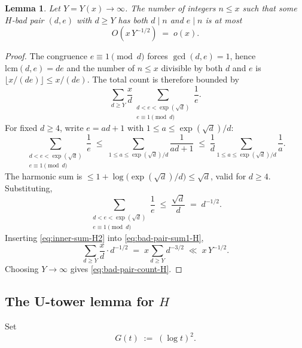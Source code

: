 \documentclass[11pt,reqno]{amsart}
\theoremstyle{plain}
\newtheorem{lemma}[theorem]{Lemma}
\theoremstyle{definition}
\begin{document}
\begin{lemma}\label{lem:bad-pair-density-H}
Let $Y=Y(x)\to\infty$. The number of integers $n\le x$ such that some
$H$-bad pair $(d,e)$ with $d\ge Y$ has both $d\mid n$ and $e\mid n$ is at most
\begin{equation}\label{eq:bad-pair-count-H}
O\!\left(x\, Y^{-1/2}\right) \;=\; o(x).
\end{equation}
\end{lemma}

\begin{proof}
The congruence $e\equiv 1\pmod d$ forces $\gcd(d,e)=1$, hence
$\mathrm{lcm}(d,e)=de$ and the number of $n\le x$ divisible by both
$d$ and $e$ is $\lfloor x/(de)\rfloor\le x/(de)$. The total count is therefore
bounded by
\begin{equation}\label{eq:bad-pair-sum1-H}
\sum_{d\ge Y} \frac{x}{d}
\sum_{\substack{d<e<\exp(\sqrt d)\\ e\equiv 1\pmod d}} \frac{1}{e}.
\end{equation}
For fixed $d\ge 4$, write $e=ad+1$ with $1\le a\le \exp(\sqrt d)/d$:
\begin{equation}\label{eq:inner-sum-H}
\sum_{\substack{d<e<\exp(\sqrt d)\\ e\equiv 1\pmod d}}\frac{1}{e}
\;\le\;\sum_{1\le a\le \exp(\sqrt d)/d} \frac{1}{ad+1}
\;\le\; \frac{1}{d}\sum_{1\le a\le \exp(\sqrt d)/d} \frac{1}{a}.
\end{equation}
The harmonic sum is $\le 1+\log\bigl(\exp(\sqrt d)/d\bigr)\le \sqrt d$, valid for
$d\ge 4$. Substituting,
\begin{equation}\label{eq:inner-sum-H2}
\sum_{\substack{d<e<\exp(\sqrt d)\\ e\equiv 1\pmod d}}\frac{1}{e}
\;\le\; \frac{\sqrt d}{d}
\;=\; d^{-1/2}.
\end{equation}
Inserting \eqref{eq:inner-sum-H2} into \eqref{eq:bad-pair-sum1-H},
\begin{equation}\label{eq:bad-pair-sum2-H}
\sum_{d\ge Y}\frac{x}{d}\cdot d^{-1/2}
\;=\; x\sum_{d\ge Y} d^{-3/2}
\;\ll\; x\, Y^{-1/2}.
\end{equation}
Choosing $Y\to\infty$ gives \eqref{eq:bad-pair-count-H}.
\end{proof}

\subsection{The U-tower lemma for $H$}

Set
\begin{equation}\label{eq:G-def}
G(t) \;:=\; (\log t)^2.
\end{equation}
\end{document}
